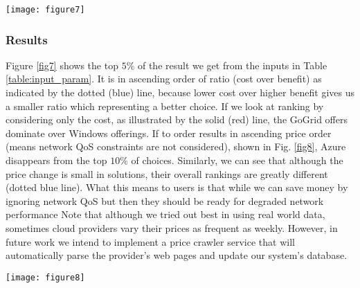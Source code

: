 \documentclass[journal]{IEEEtran}
\begin{document}
\begin{figure*}[!htp]
 \centering
 \texttt{[image: figure7]}
 \caption{Results in ascending order by (cost / benefit) ratio}
\label{fig7}
\end{figure*}


\subsubsection{Results}

Figure \ref{fig7} shows the top $5\%$ of the result we get from the inputs in Table \ref{table:input_param}. It is in ascending order of ratio (cost over benefit) as indicated by the dotted (blue) line, because lower cost over higher benefit gives us a smaller ratio which representing a better choice.  If we look at ranking by considering only the cost, as illustrated by the solid (red) line, the GoGrid offers dominate over Windows offerings. If to order results in ascending price order (means network QoS constraints are not considered), shown in Fig. \ref{fig8}, Azure disappears from the top $10\%$ of choices. Similarly, we can see that although the price change is small in solutions, their overall rankings are greatly different (dotted blue line). What this means to users is that while we can save money by ignoring network QoS but then they should be ready for degraded network performance Note that although we tried out best in using real world data, sometimes cloud providers vary their prices as frequent as weekly. However, in future work we intend to implement a price crawler service that will automatically parse the provider's web pages and update our system's database.
\begin{figure*}[!htp]
 \centering
 \texttt{[image: figure8]}
 \caption{Results in ascending order by cost}
\label{fig8}
\end{figure*}
\end{document}
